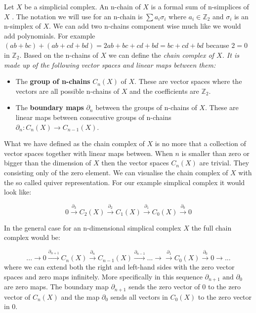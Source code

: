 Let $X$ be a simplicial complex. An n-chain of $X$ is a formal sum of n-simplices of $X$ \cite{comp-topo}. The notation we will use for an n-chain is $\sum{a_i \sigma_i}$ where $a_i \in \mathbb{Z}_2$ and $\sigma_i$ is an n-simplex of $X$. We can add two n-chains component wise much like we would add polynomials. For example $(ab + bc) + (ab + cd + bd) = 2ab + bc + cd + bd = bc + cd + bd$ because $2 = 0$ in $\mathbb{Z}_2$. Based on the n-chains of $X$ we can define the \em chain complex \em of $X$. It is made up of the following vector spaces and linear maps between them:


\begin{itemize}

    \item The \textbf{group of n-chains} $C_n(X)$ of $X$. These are vector spaces where the vectors are all possible n-chains of $X$ and the coefficients are $\mathbb{Z}_2$.

    \item The \textbf{boundary maps} $\partial_n$ between the groups of n-chains of $X$. These are linear maps between consecutive groups of n-chains $\partial_n : C_n(X) \to C_{n-1}(X)$.

\end{itemize}

What we have defined as the chain complex of $X$ is no more that a collection of vector spaces together with linear maps between. When $n$ is smaller than zero or bigger than the dimension of $X$ then the vector spaces $C_n(X)$ are trivial. They consisting only of the zero element. We can visualise the chain complex of $X$ with the so called quiver representation. For our example simplical complex it would look like:

$$ 0 \overset{\partial_{3}}{\longrightarrow} C_2(X) \overset{\partial_{2}}{\longrightarrow} C_{1}(X) \overset{\partial_{1}}{\longrightarrow} C_{0}(X) \overset{\partial_0}{\longrightarrow}  0 $$

In the general case for an n-dimensional simplical complex $X$ the full chain complex would be:

$$ ... \longrightarrow 0 \overset{\partial_{n+1}}{\longrightarrow} C_n(X) \overset{\partial_{n}}{\longrightarrow} C_{n-1}(X) \overset{\partial_{n-1}}{\longrightarrow} ... \longrightarrow  \overset{\partial_1}{\longrightarrow} C_0(X) \overset{\partial_0}{\longrightarrow} 0 \longrightarrow ... $$
where we can extend both the right and left-hand sides with the zero vector spaces and zero maps infinitely. More specifically in this sequence $\partial_{n+1} \text{ and } \partial_{0}$ are zero maps. The boundary map $\partial_{n+1}$ sends the zero vector of $0$ to the zero vector of $C_n(X)$ and the map $\partial_0$ sends all vectors in $C_0(X)$ to the zero vector in $0$.

